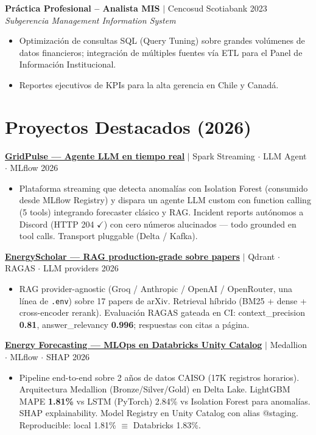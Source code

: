 \documentclass[a4paper,10pt]{article}
\newcommand{\sectionspace}{\vspace{0.15cm}}
\newcommand{\entryspace}{\vspace{0.12cm}}
\begin{document}
\noindent\textbf{Práctica Profesional -- Analista MIS} $|$ Cencosud Scotiabank \hfill 2023 \\
\textit{Subgerencia Management Information System}
\begin{itemize}
    \item Optimización de consultas SQL (Query Tuning) sobre grandes volúmenes de datos financieros; integración de múltiples fuentes vía ETL para el Panel de Información Institucional.
    \item Reportes ejecutivos de KPIs para la alta gerencia en Chile y Canadá.
\end{itemize}

\sectionspace

\section*{Proyectos Destacados (2026)}

\noindent\textbf{\href{https://github.com/jsanchez-ds/gridpulse-realtime-agent}{GridPulse --- Agente LLM en tiempo real}} $|$ Spark Streaming $\cdot$ LLM Agent $\cdot$ MLflow \hfill 2026
\begin{itemize}
    \item Plataforma streaming que detecta anomalías con Isolation Forest (consumido desde MLflow Registry) y dispara un agente LLM custom con function calling (5 tools) integrando forecaster clásico y RAG. Incident reports autónomos a Discord (HTTP 204 $\checkmark$) con cero números alucinados --- todo grounded en tool calls. Transport pluggable (Delta / Kafka).
\end{itemize}
\entryspace

\noindent\textbf{\href{https://github.com/jsanchez-ds/energyscholar-rag}{EnergyScholar --- RAG production-grade sobre papers}} $|$ Qdrant $\cdot$ RAGAS $\cdot$ LLM providers \hfill 2026
\begin{itemize}
    \item RAG provider-agnostic (Groq / Anthropic / OpenAI / OpenRouter, una línea de \texttt{.env}) sobre 17 papers de arXiv. Retrieval híbrido (BM25 + dense + cross-encoder rerank). Evaluación RAGAS gateada en CI: context\_precision \textbf{0.81}, answer\_relevancy \textbf{0.996}; respuestas con citas a página.
\end{itemize}
\entryspace

\noindent\textbf{\href{https://github.com/jsanchez-ds/energy-forecasting-databricks}{Energy Forecasting --- MLOps en Databricks Unity Catalog}} $|$ Medallion $\cdot$ MLflow $\cdot$ SHAP \hfill 2026
\begin{itemize}
    \item Pipeline end-to-end sobre 2 años de datos CAISO (17K registros horarios). Arquitectura Medallion (Bronze/Silver/Gold) en Delta Lake. LightGBM MAPE \textbf{1.81\%} vs LSTM (PyTorch) 2.84\% vs Isolation Forest para anomalías. SHAP explainability. Model Registry en Unity Catalog con alias @staging. Reproducible: local 1.81\% $\equiv$ Databricks 1.83\%.
\end{itemize}
\end{document}
